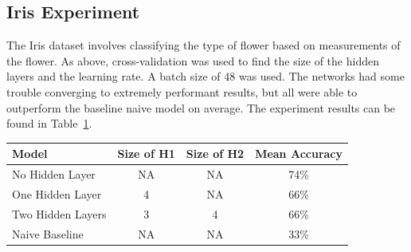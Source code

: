 \documentclass{amsart}
\begin{document}
    \subsection*{Iris Experiment}
    The Iris dataset\cite{irisdataset} involves classifying the type of flower based on measurements
    of the flower. As above, cross-validation was used to find the size of the hidden layers and the learning
    rate. A batch size of 48 was used. The networks had some trouble converging to extremely
    performant results, but all were able to outperform the baseline naive model on average.
    The experiment results can be found in Table~\ref{iris_results}.
    \begin{table}[H]
    \begin{tabular}{lccc}
    Model & Size of H1 & Size of H2 & Mean Accuracy \\
    \hline
    No Hidden Layer & NA & NA & 74\% \\
    One Hidden Layer & 4 & NA & 66\% \\
    Two Hidden Layers & 3 & 4 & 66\% \\
    Naive Baseline & NA & NA & 33\%
    \end{tabular}
    \label{iris_results}
    \end{table}



\end{document}
